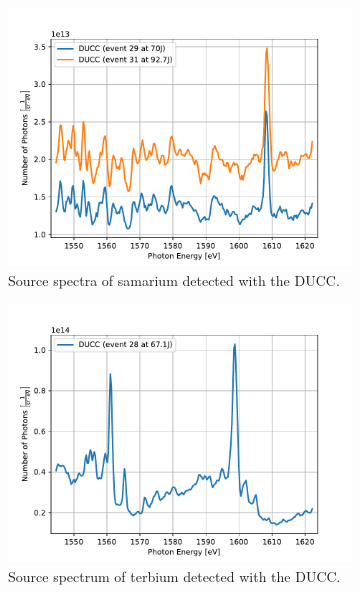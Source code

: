 \begin{figure} [H]
	\centering
	\begin{subfigure}[t]{0.49\textwidth}
		\centering
		\includegraphics[width=\textwidth]{Data_Analysis/basic_spectra/spectra_of_Sm_events_29_31.pdf}
		\caption{Source spectra of samarium detected with the DUCC.}
		\label{}
	\end{subfigure}%
	\hfill
	\begin{subfigure}[t]{0.49\textwidth}
		\centering
		\includegraphics[width=\textwidth]{Data_Analysis/basic_spectra/basic_spectrum_of_Tb_event_28_on_DUCC.pdf}
		\caption{Source spectrum of terbium detected with the DUCC.}
		\label{}
	\end{subfigure}
	\begin{subfigure}[t]{0.49\textwidth}

\end{subfigure}
\end{figure}
